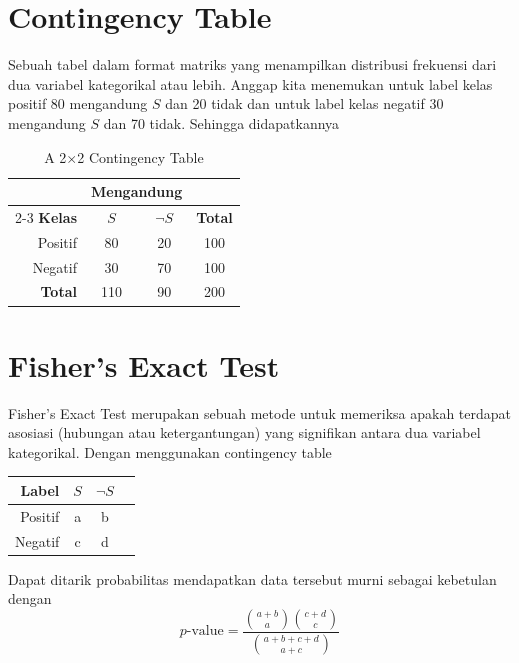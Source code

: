 \documentclass[a4paper,twoside]{article}
\begin{document}
\section{Contingency Table}
Sebuah tabel dalam format matriks yang menampilkan distribusi frekuensi dari dua variabel kategorikal atau lebih.
Anggap kita menemukan untuk label kelas positif 80 mengandung $S$ dan 20 tidak dan untuk label kelas negatif 30 mengandung $S$ dan 70 tidak.
Sehingga didapatkannya 

\begin{table}[ht]
	\centering
	\caption{A 2$\times$2 Contingency Table}
	\label{tab:contingency_example}
	\begin{tabular}{rccc}
		\toprule
		& \multicolumn{2}{c}{\textbf{Mengandung}} & \\
		\cmidrule(lr){2-3}
		\textbf{Kelas} & $S$ & $\neg S$ & \textbf{Total} \\
		\midrule
		Positif & 80 & 20 & 100 \\
		Negatif & 30 & 70 & 100 \\
		\midrule
		\textbf{Total} & 110 & 90 & 200 \\
		\bottomrule
	\end{tabular}
\end{table} 

\section{Fisher's Exact Test}
Fisher's Exact Test merupakan sebuah metode untuk memeriksa apakah terdapat asosiasi (hubungan atau ketergantungan) yang signifikan antara dua variabel kategorikal.
Dengan menggunakan contingency table 

\begin{table}[ht]
	\centering
	\begin{tabular}{rccc}
		\textbf{Label} & $S$ & $\neg S$ \\
		\midrule
		Positif & a & b \\
		Negatif & c & d \\
	\end{tabular}
\end{table}

Dapat ditarik probabilitas mendapatkan data tersebut murni sebagai kebetulan dengan \[ p\text{-value} = \frac{\binom{a+b}{a}\binom{c+d}{c}}{\binom{a+b+c+d}{a+c}} \]
\end{document}
